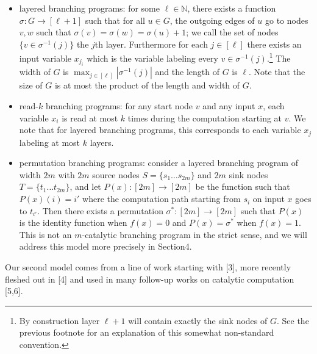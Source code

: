 \documentclass[10pt,a4paper]{article}
\begin{document}
\begin{itemize}
\item layered branching programs: for some $\ell\in\mathbb N$, there exists a function $\sigma:G\to[\ell+1]$ such that for all $u\in G$, the outgoing edges of $u$ go to nodes $v,w$ such that $\sigma(v)=\sigma(w)=\sigma(u)+1$; we call the set of nodes $\{v\in\sigma^{-1}(j)\}$ the $j$th layer. Furthermore for each $j\in[\ell]$ there exists an input variable $x_{j_i}$ which is the variable labeling every $v\in\sigma^{-1}(j)$.\footnote{By construction layer $\ell+1$ will contain exactly the sink nodes of $G$. See the previous footnote for an explanation of this somewhat non-standard convention.} The width of $G$ is $\max_{j\in[\ell]}|\sigma^{-1}(j)|$ and the length of $G$ is $\ell$. Note that the size of $G$ is at most the product of the length and width of $G$.
\item read-$k$ branching programs: for any start node $v$ and any input $x$, each variable $x_i$ is read at most $k$ times during the computation starting at $v$. We note that for layered branching programs, this corresponds to each variable $x_j$ labeling at most $k$ layers.
\item permutation branching programs: consider a layered branching program of width $2m$ with $2m$ source nodes $S=\{s_1\ldots s_{2m}\}$ and $2m$ sink nodes $T=\{t_1\ldots t_{2m}\}$, and let $P(x):[2m]\to[2m]$ be the function such that $P(x)(i)=i'$ where the computation path starting from $s_i$ on input $x$ goes to $t_{i'}$. Then there exists a permutation $\sigma^*:[2m]\to[2m]$ such that $P(x)$ is the identity function when $f(x)=0$ and $P(x)=\sigma^*$ when $f(x)=1$. This is not an $m$-catalytic branching program in the strict sense, and we will address this model more precisely in Section4.
\end{itemize}
Our second model comes from a line of work starting with [3], more recently fleshed out in [4] and used in many follow-up works on catalytic computation [5,6].
\end{document}
